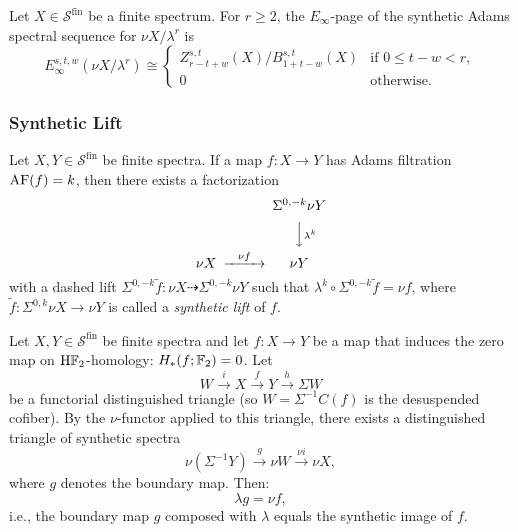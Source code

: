 \begin{proposition}\label{prereq:prop:syn-einfty-mod-lambda}
    \leanok
    Let $X \in \mathcal{S}^{\mathrm{fin}}$ be a finite spectrum. For $r \ge 2$, the $E_\infty$-page of the synthetic Adams spectral sequence for $\nu X / \lambda^r$ is
    $$E_\infty^{s,t,w}(\nu X / \lambda^r) \cong \begin{cases}
        Z_{r-t+w}^{s,t}(X) / B_{1+t-w}^{s,t}(X) & \text{if } 0 \le t - w < r, \\
        0 & \text{otherwise}.
    \end{cases}$$
\end{proposition}

\subsubsection{Synthetic Lift}\label{sec:prereq-syn-lift}

\begin{axiom}\label{prereq:ax:synthetic-lift}
    \leanok
    Let $X, Y \in \mathcal{S}^{\mathrm{fin}}$ be finite spectra. If a map $f: X \to Y$ has Adams filtration $\mathrm{AF}(f) = k$, then there exists a factorization
    $$\begin{CD}
    @. \Sigma^{0,-k}\nu Y \\
    @. @VV{\lambda^k}V \\
    \nu X @>{\nu f}>> \nu Y
    \end{CD}$$
    with a dashed lift $\Sigma^{0,-k}\tilde{f}: \nu X \dashrightarrow \Sigma^{0,-k}\nu Y$ such that $\lambda^k \circ \Sigma^{0,-k}\tilde{f} = \nu f$,
    where $\tilde{f}: \Sigma^{0,k}\nu X \to \nu Y$ is called a \emph{synthetic lift} of $f$.
\end{axiom}

\begin{axiom}\label{prereq:ax:lambda-g-equals-f}
    Let $X, Y \in \mathcal{S}^{\mathrm{fin}}$ be finite spectra and let $f: X \to Y$ be a map that induces the zero map on $\mathrm{H}{\mathbb F}_2$-homology: $H_*(f; {\mathbb F}_2) = 0$. Let
    $$W \xrightarrow{i} X \xrightarrow{f} Y \xrightarrow{h} \Sigma W$$
    be a functorial distinguished triangle (so $W = \Sigma^{-1}C(f)$ is the desuspended cofiber). By the $\nu$-functor applied to this triangle, there exists a distinguished triangle of synthetic spectra
    $$\nu(\Sigma^{-1}Y) \xrightarrow{g} \nu W \xrightarrow{\nu i} \nu X,$$
    where $g$ denotes the boundary map. Then:
    $$\lambda g = \nu f,$$
    i.e., the boundary map $g$ composed with $\lambda$ equals the synthetic image of $f$.
\end{axiom}

